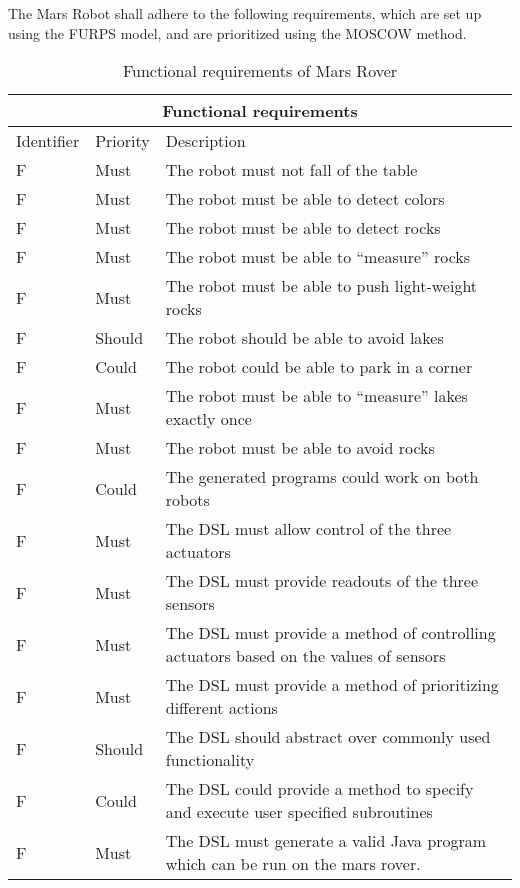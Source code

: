 The Mars Robot shall adhere to the following requirements, which are set up
using the FURPS model, and are prioritized using the MOSCOW method.

\setcounter{TCC}{1}
\begin{table}[H]
	\centering
	\begin{tabular}{|l|l|l|}
		\hline
		\multicolumn{3}{|c|}{Functional requirements} \\  \hline
		\hline
		Identifier & Priority & Description \\  
		\hline
		\hline
		F\doTCC  & Must & The robot must not fall of the table \\  \hline
		F\doTCC  & Must & The robot must be able to detect colors \\  \hline
		F\doTCC  & Must & The robot must be able to detect rocks \\  \hline
		F\doTCC  & Must & The robot must be able to ``measure'' rocks \\  \hline
		F\doTCC  & Must & The robot must be able to push light-weight rocks 
			\\  \hline
		F\doTCC  & Should & The robot should be able to avoid lakes \\  \hline
		F\doTCC  & Could & The robot could be able to park in a corner 
			\\  \hline
		F\doTCC  & Must & The robot must be able to ``measure'' lakes exactly 
			once \\  \hline
		F\doTCC & Must & The robot must be able to avoid rocks \\  \hline
		F\doTCC & Could & The generated programs could work on both robots
			\\  \hline
		F\doTCC & Must & The DSL must allow control of the three actuators 
			\\  \hline
		F\doTCC & Must & The DSL must provide readouts of the three sensors
			\\  \hline
		F\doTCC & Must & The DSL must provide a method of controlling actuators
			based on the values of sensors \\  \hline
		F\doTCC & Must & The DSL must provide a method of prioritizing different
			actions \\  \hline
		F\doTCC & Should & The DSL should abstract over commonly used 
			functionality \\  \hline
		F\doTCC & Could & The DSL could provide a method to specify and execute
			user specified subroutines \\  \hline
		F\doTCC & Must & The DSL must generate a valid Java program which can be
			run on the mars rover. \\  
		\hline
	\end{tabular}
\caption{Functional requirements of Mars Rover}
\label{tbl:functionalReq}
\end{table}

